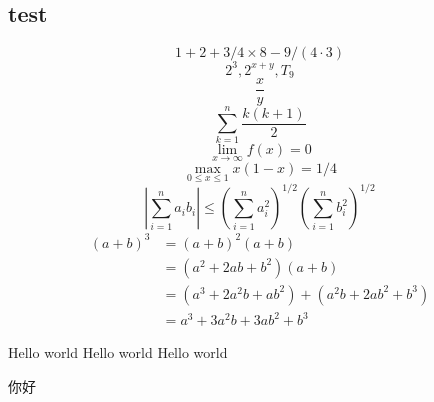 \documentclass{article}
\begin{document}
\begin{CJK}{UTF8}{gbsn}

\section{test}
\[	1+2+3/4\times8-9/(4\cdot3)	\]
\[	2^3, 2^{x+y}, T_{9}	\]
\[	\frac{x}{y}	\]
\[	\sum_{k=1}^n \frac{k(k+1)}{2}	\]
\[	\lim_{x\to\infty}f(x)=0	\]
\[	\max_{0\le x \le 1}x(1-x)=1/4	\]
\[
\left|\sum_{i=1}^n a_ib_i\right|
\le
\left(\sum_{i=1}^n a_i^2\right)^{1/2}
\left(\sum_{i=1}^n b_i^2\right)^{1/2}
\]
\begin{align} 
(a+b)^3 &= (a+b)^2(a+b)\\
&=(a^2+2ab+b^2)(a+b)\\
&=(a^3+2a^2b+ab^2) + (a^2b+2ab^2+b^3)\\
&=a^3+3a^2b+3ab^2+b^3
\end{align}


Hello world
Hello world
Hello world

你好

\end{CJK}
\end{document}
